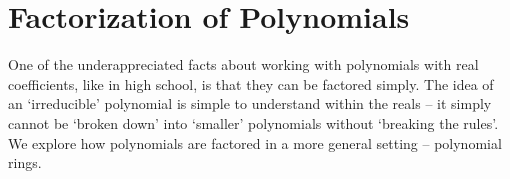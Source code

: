 \chapter{Factorization of Polynomials}
One of the underappreciated facts about working with polynomials with real coefficients, like in high school, is that they can be factored simply. The idea of an `irreducible' polynomial is simple to understand within the reals -- it simply cannot be `broken down' into `smaller' polynomials without `breaking the rules'. We explore how polynomials are factored in a more general setting -- polynomial rings.
